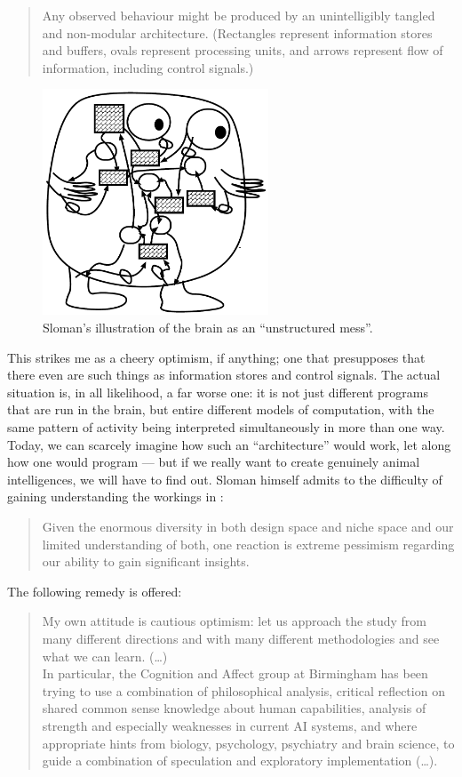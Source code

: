 \begin{quotation}
	Any observed behaviour might be produced by an unintelligibly tangled and non-modular architecture. (Rectangles represent information stores and buffers, ovals represent processing
	units, and arrows represent flow of information, including control signals.)
\end{quotation}

\begin{figure}
	\centering
	\includegraphics[width=0.6\textwidth]{Figs/slomanBrain.png}
	\caption{Sloman's illustration of the brain as an ``unstructured mess''.}
	\label{fig:slomanBrain}
\end{figure}

This strikes me as a cheery optimism, if anything; one that presupposes that there even are such things as information stores and control signals. The actual situation is, in all likelihood, a far worse one: it is not just different programs that are run in the brain, but entire different models of computation, with the same pattern of activity being interpreted simultaneously in more than one way.
Today, we can scarcely imagine how such an ``architecture'' would work, let along how one would program --- but if we really want to create genuinely animal intelligences, we will have to find out. Sloman himself admits to the difficulty of gaining understanding the workings in \cite[p. 6, Section 9 ``Is the task too hard?'']{sloman1997}:
\begin{quotation}
Given the enormous diversity in both design space and niche space and our limited understanding of both, one reaction is extreme pessimism regarding our ability to gain significant insights.
\end{quotation}
The following remedy is offered:
\begin{quotation}
My own attitude is cautious optimism: let us approach the study from many different directions and with many different methodologies and see what we can learn. (\dots)\\
In particular, the Cognition and Affect group at Birmingham has been trying to use a combination of philosophical analysis, critical reflection on shared common sense knowledge about human capabilities, analysis of strength and especially weaknesses in current AI systems, and where appropriate hints from biology, psychology, psychiatry and brain science, to guide a combination of speculation and exploratory implementation (\dots).
\end{quotation}

